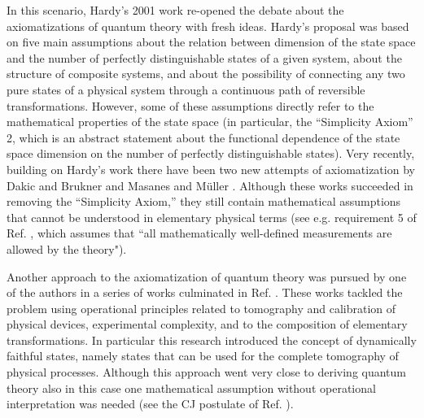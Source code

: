 \documentclass[12pt,aps,pra,showpacs,groupedaddress]{revtex4-1}
\begin{document}
In this scenario, Hardy's 2001 work \cite{Har01} re-opened the debate about the axiomatizations of
quantum theory with fresh ideas. Hardy's proposal was based on five main assumptions about the relation between
dimension of the state space and the number of perfectly distinguishable states of a given system, about 
the structure of composite systems, and about the possibility of connecting any two pure states of a
physical system through a continuous path of reversible transformations.  However, some of these assumptions
directly refer to the mathematical properties of the state space (in particular, the ``Simplicity Axiom'' 2, which is an abstract statement about the functional dependence of the state space dimension on the number of perfectly distinguishable states).    Very recently, building on Hardy's work
there have been two new attempts of axiomatization by Dakic and Brukner \cite{DakBru09} and Masanes
and M\"uller \cite{Mas10}. Although these works succeeded in removing the ``Simplicity Axiom,'' they
still contain mathematical assumptions that cannot be understood in elementary physical terms (see e.g.
requirement 5 of Ref. \cite{Mas10}, which assumes that ``all mathematically well-defined
measurements are allowed by the theory").

Another approach to the axiomatization of quantum theory was pursued by one of the authors in a
series of works \cite{maurofirst} culminated in Ref. \cite{maurolast}.  These works tackled the
problem using operational principles related to tomography and calibration of physical devices,
experimental complexity, and to the composition of elementary transformations.  In particular this
research introduced the concept of dynamically faithful states, namely states that can be used for
the complete tomography of physical processes.  Although this approach went very close to deriving
quantum theory also in this case one mathematical assumption without operational interpretation was needed (see the CJ postulate of
Ref. \cite{maurolast}).
\end{document}
